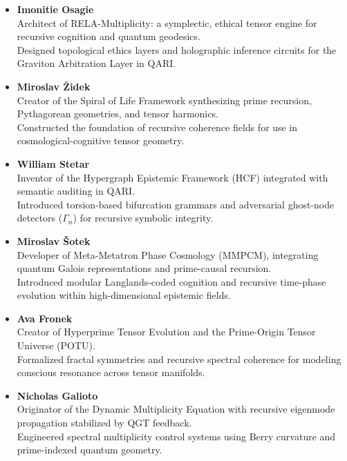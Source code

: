 \documentclass[12pt]{article}
\begin{document}
\begin{itemize}
\item \textbf{Imonitie Osagie} \cite{osagie2025rela}\\
Architect of RELA-Multiplicity: a symplectic, ethical tensor engine for recursive cognition and quantum geodesics.\\
Designed topological ethics layers and holographic inference circuits for the Graviton Arbitration Layer in QARI.

\item \textbf{Miroslav Židek} \cite{zidek2025spiral}\\
Creator of the Spiral of Life Framework synthesizing prime recursion, Pythagorean geometries, and tensor harmonics.\\
Constructed the foundation of recursive coherence fields for use in cosmological-cognitive tensor geometry.

\item \textbf{William Stetar} \cite{stetar2025recursive}\\
Inventor of the Hypergraph Epistemic Framework (HCF) integrated with semantic auditing in QARI.\\
Introduced torsion-based bifurcation grammars and adversarial ghost-node detectors ($\Gamma_n$) for recursive symbolic integrity.

\item \textbf{Miroslav Šotek} \cite{sotek2025metatron}\\
Developer of Meta-Metatron Phase Cosmology (MMPCM), integrating quantum Galois representations and prime-causal recursion.\\
Introduced modular Langlands-coded cognition and recursive time-phase evolution within high-dimensional epistemic fields.

\item \textbf{Ava Fronek} \cite{fronek2025potu}\\
Creator of Hyperprime Tensor Evolution and the Prime-Origin Tensor Universe (POTU).\\
Formalized fractal symmetries and recursive spectral coherence for modeling conscious resonance across tensor manifolds.
\item \textbf{Nicholas Galioto} \cite{galioto2025multiplicity}\\
Originator of the Dynamic Multiplicity Equation with recursive eigenmode propagation stabilized by QGT feedback.\\
Engineered spectral multiplicity control systems using Berry curvature and prime-indexed quantum geometry.







\end{itemize}
\end{document}
